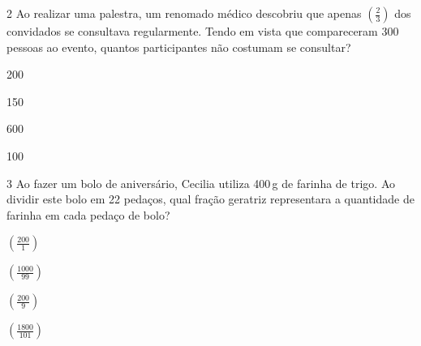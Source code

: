 




\num{2} Ao realizar uma palestra, um renomado médico descobriu que apenas
$(\frac{2}{3})$ dos convidados se consultava regularmente. Tendo em
vista que compareceram 300 pessoas ao evento, quantos participantes não
costumam se consultar?

\begin{escolha}[itemsep=0pt]
\item 200
\item 150
\item 600
\item 100
\end{escolha}









\num{3} Ao fazer um bolo de aniversário, Cecilia utiliza 400\,g de farinha de
trigo. Ao dividir este bolo em 22 pedaços, qual fração geratriz
representara a quantidade de farinha em cada pedaço de bolo?

\begin{escolha}[itemsep=0pt]
\item $(\frac{200}{1})$ 
\item $(\frac{1000}{99})$ 
\item $(\frac{200}{9})$ 
\item $(\frac{1800}{101})$ 
\end{escolha}

